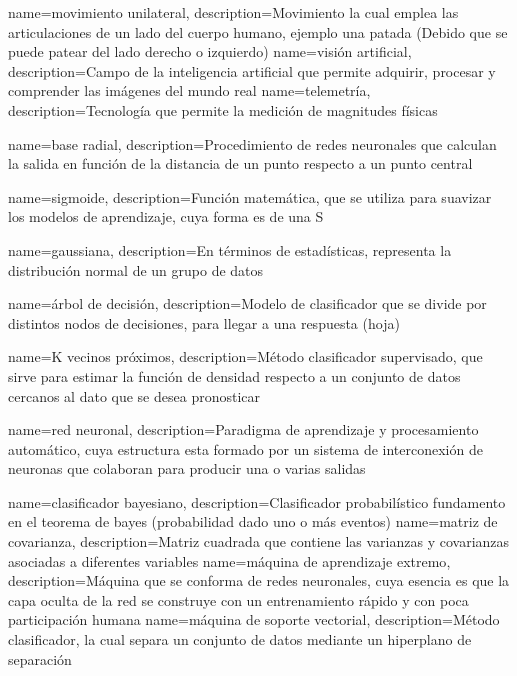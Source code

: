  {
 name={movimiento unilateral},
 description={Movimiento la cual emplea las articulaciones de un lado del cuerpo humano, ejemplo una patada (Debido que se puede patear del lado derecho o izquierdo)}
 }
 {
 name={visi\'on artificial},
 description={Campo de la  inteligencia artificial que permite adquirir, procesar y comprender las im\'agenes del mundo real}
 }
 {
 name={telemetr\'ia},
 description={Tecnolog\'ia que permite la medici\'on de magnitudes f\'isicas}
 }

 {
 name={base radial},
 description={Procedimiento de redes neuronales que calculan la salida en funci\'on de la distancia de un punto respecto a un punto central }
 }
 
 {
 name={sigmoide},
 description={Funci\'on matem\'atica, que se utiliza para suavizar los modelos de aprendizaje, cuya forma es de una S }
 }
 
 {
 name={gaussiana},
 description={En t\'erminos de estad\'isticas, representa la distribuci\'on normal de un grupo de datos}
 }
 
 {
 name={\'arbol de decisi\'on},
 description={Modelo de clasificador que se divide por distintos nodos de decisiones, para llegar a una respuesta (hoja)}
 }
 
 {
 name={K vecinos pr\'oximos},
 description={M\'etodo clasificador supervisado, que sirve para estimar la funci\'on de densidad respecto a un conjunto de datos cercanos al dato que se desea pronosticar}
 } 
 
 {
 name={red neuronal},
 description={Paradigma de aprendizaje y procesamiento autom\'atico, cuya estructura esta formado por un sistema de interconexi\'on de neuronas que colaboran para producir una o varias salidas}
 }
 
 {
 name={clasificador bayesiano},
 description={Clasificador probabil\'istico fundamento en el teorema de bayes (probabilidad dado uno o m\'as eventos)}
 }
 {
 name={matriz de covarianza},
 description={Matriz cuadrada que contiene las varianzas y covarianzas asociadas a diferentes variables}
 } 
 {
 name={m\'aquina de aprendizaje extremo},
 description={M\'aquina que se conforma de redes neuronales, cuya esencia es que la capa oculta de la red se construye con un entrenamiento r\'apido y con poca participaci\'on humana}
 }  
 {
 name={m\'aquina de soporte vectorial},
 description={M\'etodo clasificador, la cual separa un conjunto de datos mediante un hiperplano de separaci\'on}
 }
 
